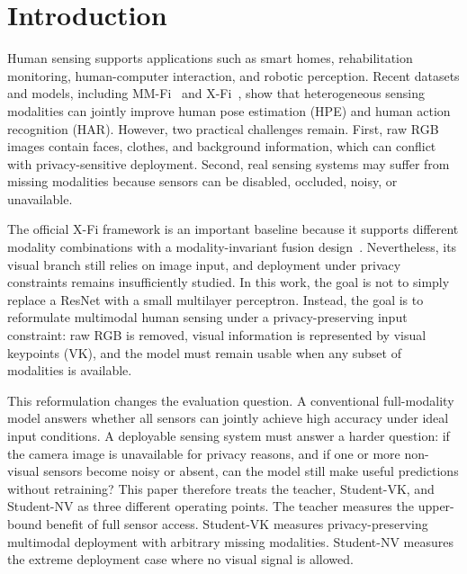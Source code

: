\documentclass[journal, twocolumn, transmag]{IEEEtran}
\newcommand{\mmfi}{MM-Fi}
\newcommand{\xfi}{X-Fi}
\begin{document}
\section{Introduction}
\lettrine[lines=2]{H}{}uman sensing supports applications such as smart homes, rehabilitation monitoring, human-computer interaction, and robotic perception. Recent datasets and models, including \mmfi{}~\cite{mmfi} and \xfi{}~\cite{xfi}, show that heterogeneous sensing modalities can jointly improve human pose estimation (HPE) and human action recognition (HAR). However, two practical challenges remain. First, raw RGB images contain faces, clothes, and background information, which can conflict with privacy-sensitive deployment. Second, real sensing systems may suffer from missing modalities because sensors can be disabled, occluded, noisy, or unavailable.

The official \xfi{} framework is an important baseline because it supports different modality combinations with a modality-invariant fusion design~\cite{xfi}. Nevertheless, its visual branch still relies on image input, and deployment under privacy constraints remains insufficiently studied. In this work, the goal is not to simply replace a ResNet with a small multilayer perceptron. Instead, the goal is to reformulate multimodal human sensing under a privacy-preserving input constraint: raw RGB is removed, visual information is represented by visual keypoints (VK), and the model must remain usable when any subset of modalities is available.

This reformulation changes the evaluation question. A conventional full-modality model answers whether all sensors can jointly achieve high accuracy under ideal input conditions. A deployable sensing system must answer a harder question: if the camera image is unavailable for privacy reasons, and if one or more non-visual sensors become noisy or absent, can the model still make useful predictions without retraining? This paper therefore treats the teacher, Student-VK, and Student-NV as three different operating points. The teacher measures the upper-bound benefit of full sensor access. Student-VK measures privacy-preserving multimodal deployment with arbitrary missing modalities. Student-NV measures the extreme deployment case where no visual signal is allowed.
\end{document}
